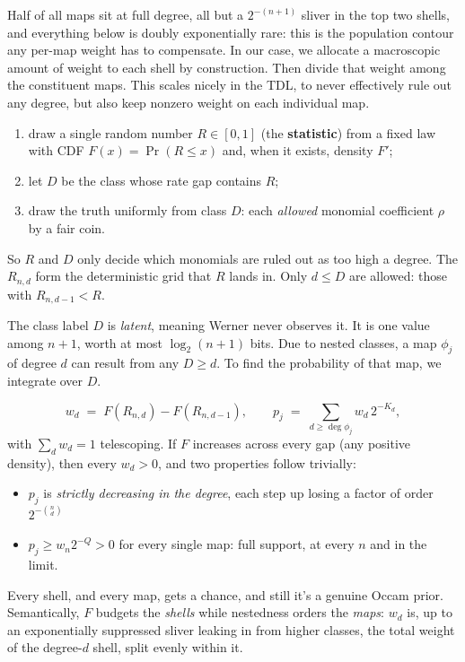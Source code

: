 \documentclass[11pt]{article}
\begin{document}
Half of all maps sit at full degree, all but a $2^{-(n+1)}$ sliver in
the top two shells, and everything below is doubly exponentially rare:
this is the population contour any per-map weight has to compensate. In our case, we allocate
a macroscopic amount of weight to each shell by construction. Then divide that weight among 
the constituent maps. This scales nicely in the TDL, to never effectively rule out any degree, but also keep nonzero weight on each individual map.
%
\begin{enumerate}
  \item draw a single random number $R \in [0,1]$ (the
    \textbf{statistic}) from a fixed law with CDF
    $F(x) = \Pr(R \le x)$ and, when it exists, density $F'$;
  \item let $D$ be the class whose rate gap contains $R$;
  \item draw the truth uniformly from class $D$: each \emph{allowed} monomial
    coefficient $\rho$ by a fair coin.
\end{enumerate}
%
So $R$ and $D$ only decide which monomials are ruled out as too high a degree.
The $R_{n,d}$ form the deterministic grid that $R$ lands in.
Only $d \le D$ are allowed: those with $R_{n,d-1} < R$.

 The class
label $D$ is \emph{latent}, meaning Werner never observes it. It is one value
among $n+1$, worth at most $\log_2(n+1)$ bits. Due to nested classes, a map $\phi_j$ of degree $d$ can result
from any $D \ge d$. To find the probability of that map, we integrate over $D$.

%
\begin{equation}
  w_d \;=\; F(R_{n,d}) - F(R_{n,d-1}),
  \qquad
  p_j \;=\; \sum_{d \ge \deg\phi_j} w_d\, 2^{-K_d},
  \label{eq:shapepj}
\end{equation}
%
with $\sum_d w_d = 1$ telescoping. If $F$ increases across every gap
(any positive density), then every $w_d > 0$, and two properties
follow trivially: 
\begin{itemize}
  \item $p_j$ is \emph{strictly decreasing in the degree},
each step up losing a factor of order $2^{-\binom nd}$
\item $p_j \ge w_n 2^{-Q} > 0$ for every single map:
full support, at every $n$ and in the limit.
\end{itemize}
Every shell, and every map, gets a chance, and still it's a genuine Occam prior. 
Semantically, $F$ budgets
the \emph{shells} while nestedness orders the \emph{maps}: $w_d$ is,
up to an exponentially suppressed sliver leaking in from higher classes, the
total weight of the degree-$d$ shell, split evenly within it. 
\end{document}
